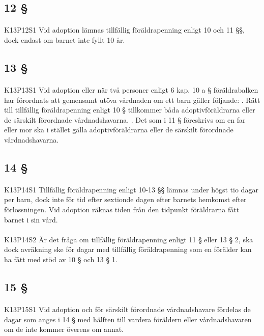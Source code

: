 \documentclass[a4paper,notitlepage,openany,10pt]{book}
\begin{document}
\subsection*{12 §}
\paragraph*{}
{\tiny K13P12S1}
Vid adoption lämnas tillfällig föräldrapenning enligt 10 och 11 §§, dock endast om barnet inte fyllt 10 år.
\subsection*{13 §}
\paragraph*{}
{\tiny K13P13S1}
Vid adoption eller när två personer enligt 6 kap. 10 a § föräldrabalken har förordnats att gemensamt utöva vårdnaden om ett barn gäller följande:
. Rätt till tillfällig föräldrapenning enligt 10 § tillkommer båda adoptivföräldrarna eller de särskilt förordnade vårdnadshavarna.
. Det som i 11 § föreskrivs om en far eller mor ska i stället gälla adoptivföräldrarna eller de särskilt förordnade vårdnadshavarna.
\subsection*{14 §}
\paragraph*{}
{\tiny K13P14S1}
Tillfällig föräldrapenning enligt 10-13 §§ lämnas under högst tio dagar per barn, dock inte för tid efter sextionde dagen efter barnets hemkomst efter förlossningen. Vid adoption räknas tiden från den tidpunkt föräldrarna fått barnet i sin vård.
\paragraph*{}
{\tiny K13P14S2}
Är det fråga om tillfällig föräldrapenning enligt 11 § eller 13 § 2, ska dock avräkning ske för dagar med tillfällig föräldrapenning som en förälder kan ha fått med stöd av 10 § och 13 § 1.
\subsection*{15 §}
\paragraph*{}
{\tiny K13P15S1}
Vid adoption och för särskilt förordnade vårdnadshavare fördelas de dagar som anges i 14 § med hälften till vardera föräldern eller vårdnadshavaren om de inte kommer överens om annat.
\end{document}
